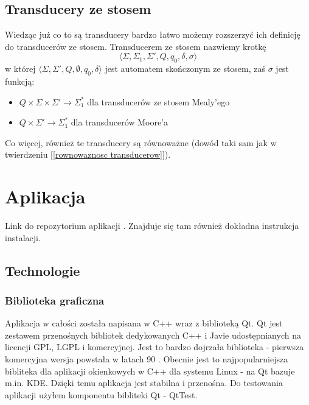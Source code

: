 \documentclass[declaration,shortabstract]{iithesis}
\theoremstyle{definition}
\theoremstyle{plain}
\begin{document}
\section{Transducery ze stosem}
Wiedząc już co to są transducery bardzo łatwo możemy rozszerzyć ich definicję do transducerów ze stosem. Transducerem ze stosem nazwiemy krotkę 
$$ \langle \Sigma, \Sigma_1, \Sigma', Q, q_0, \delta, \sigma \rangle $$
w której \( \langle \Sigma, \Sigma', Q, \emptyset, q_0, \delta \rangle \) jest automatem skończonym ze stosem, zaś \(\sigma\) jest funkcją:
\begin{itemize}
\item \( Q \times \Sigma \times \Sigma' \rightarrow \Sigma^*_1 \) dla transducerów ze stosem Mealy'ego
\item \( Q \times \Sigma' \rightarrow \Sigma^*_1 \) dla transducerów Moore'a
\end{itemize}
Co więcej, również te transducery są równoważne (dowód taki sam jak w twierdzeniu [\ref{rownowaznosc transducerow}]).
\chapter{Aplikacja}
Link do repozytorium aplikacji \cite{Repo}. Znajduje się tam również dokładna instrukcja instalacji.
\section {Technologie}
\subsection{Biblioteka graficzna}
Aplikacja w całości została napisana w C++ wraz z biblioteką Qt. Qt jest zestawem przenośnych bibliotek dedykowanych C++ i Javie udostępnianych na licencji GPL, LGPL i komercyjnej. Jest to bardzo dojrzała biblioteka - pierwsza komercyjna wersja powstała w latach 90 \cite{qt link}. Obecnie jest to najpopularniejsza bibliteka dla aplikacji okienkowych w C++ dla systemu Linux - na Qt bazuje m.in. KDE. Dzięki temu aplikacja jest stabilna i przenośna. Do testowania aplikacji użyłem komponentu bibliteki Qt - QtTest.
\end{document}

